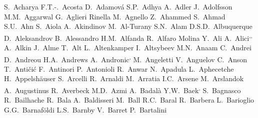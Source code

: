 
%
\begingroup
\small
\begin{flushleft}
S.~Acharya\And 
F.T.-.~Acosta\And 
D.~Adamov\'{a}\And 
S.P.~Adhya\And 
A.~Adler\And 
J.~Adolfsson\And 
M.M.~Aggarwal\And 
G.~Aglieri Rinella\And 
M.~Agnello\And 
Z.~Ahammed\And 
S.~Ahmad\And 
S.U.~Ahn\And 
S.~Aiola\And 
A.~Akindinov\And 
M.~Al-Turany\And 
S.N.~Alam\And 
D.S.D.~Albuquerque\And 
D.~Aleksandrov\And 
B.~Alessandro\And 
H.M.~Alfanda\And 
R.~Alfaro Molina\And 
Y.~Ali\And 
A.~Alici\textsuperscript{,}\textsuperscript{,}\And 
A.~Alkin\And 
J.~Alme\And 
T.~Alt\And 
L.~Altenkamper\And 
I.~Altsybeev\And 
M.N.~Anaam\And 
C.~Andrei\And 
D.~Andreou\And 
H.A.~Andrews\And 
A.~Andronic\textsuperscript{,}\And 
M.~Angeletti\And 
V.~Anguelov\And 
C.~Anson\And 
T.~Anti\v{c}i\'{c}\And 
F.~Antinori\And 
P.~Antonioli\And 
R.~Anwar\And 
N.~Apadula\And 
L.~Aphecetche\And 
H.~Appelsh\"{a}user\And 
S.~Arcelli\And 
R.~Arnaldi\And 
M.~Arratia\And 
I.C.~Arsene\And 
M.~Arslandok\And 
A.~Augustinus\And 
R.~Averbeck\And 
M.D.~Azmi\And 
A.~Badal\`{a}\And 
Y.W.~Baek\textsuperscript{,}\And 
S.~Bagnasco\And 
R.~Bailhache\And 
R.~Bala\And 
A.~Baldisseri\And 
M.~Ball\And 
R.C.~Baral\And 
R.~Barbera\And 
L.~Barioglio\And 
G.G.~Barnaf\"{o}ldi\And 
L.S.~Barnby\And 
V.~Barret\And 
P.~Bartalini\And 

\end{flushleft}
